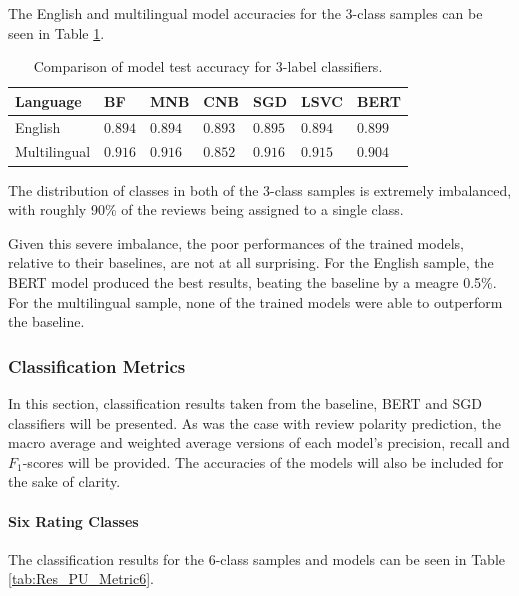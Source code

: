 The English and multilingual model accuracies for the 3-class samples can be seen in Table \ref{tab:Res_PU_Comp3}.

\begin{table}[ht]
    \centering
    \begin{tabular}{l | l l l l l l}
        \toprule
        \textbf{Language} & \textbf{BF} & \textbf{MNB} & \textbf{CNB} & \textbf{SGD} & \textbf{LSVC} & \textbf{BERT}\\\midrule
        English&$0.894$&$0.894$&$0.893$&$0.895$&$0.894$&$\mathbf{0.899}$\\
        Multilingual&$\mathbf{0.916}$&$0.916$&$0.852$&$0.916$&$0.915$&$0.904$\\
        \bottomrule
    \end{tabular}
    \caption{Comparison of model test accuracy for 3-label classifiers.}
    \label{tab:Res_PU_Comp3}
\end{table}

The distribution of classes in both of the 3-class samples is extremely imbalanced, with roughly 90\% of the reviews being assigned to a single class.

Given this severe imbalance, the poor performances of the trained models, relative to their baselines, are not at all surprising. For the English sample, the BERT model produced the best results, beating the baseline by a meagre 0.5\%. For the multilingual sample, none of the trained models were able to outperform the baseline.

\subsubsection{Classification Metrics}

In this section, classification results taken from the baseline, BERT and SGD classifiers will be presented. As was the case with review polarity prediction, the macro average and weighted average versions of each model's precision, recall and $F_1$-scores will be provided. The accuracies of the models will also be included for the sake of clarity.

\paragraph{Six Rating Classes}

The classification results for the 6-class samples and models can be seen in Table \ref{tab:Res_PU_Metric6}.

